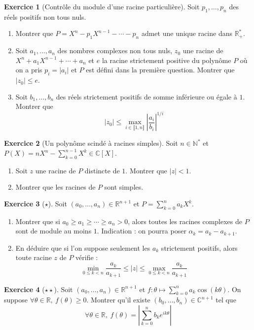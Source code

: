 \documentclass[french]{book}
\newcommand{\N}{\mathbb{N}}
\newcommand{\R}{\mathbb{R}}
\newcommand{\C}{\mathbb{C}}
\newcommand{\st}{^*}
\theoremstyle{definition}
\newtheorem{ex}{Exercice}[chapter]
\theoremstyle{theorem}
\theoremstyle{remark}
\begin{document}
\begin{ex}[Contrôle du module d'une racine particulière]
	Soit $p_1,\ldots,p_n$ des réels positifs non tous nuls.
	\begin{enumerate}
		\item Montrer que $P=X^n-p_1X^{n-1}-\cdots-p_n$ admet une unique racine dans $\R_+\st$.
		\item Soit $a_1,\ldots,a_n$ des nombres complexes non tous nuls, $z_0$ une racine de $X^n+a_1X^{n-1}+\cdots+a_n$ et $e$ la racine strictement positive du polynôme $P$ où on a pris $p_i=\lvert a_i\rvert$ et $P$ est défini dans la première question. Montrer que $\lvert z_0\rvert\leqslant e$.
		\item Soit $b_1,\ldots,b_n$ des réels strictement positifs de somme inférieure ou égale à $1$. Montrer que $$\lvert z_0\rvert\leqslant\max_{i\in\llbracket1,n\rrbracket}\left\lvert\frac{a_i}{b_i}\right\rvert^{1/i}$$
	\end{enumerate}
\end{ex}

\begin{ex}[Un polynôme scindé à racines simples]
	Soit $n\in\N\st$ et $P(X)=nX^n-\sum_{k=0}^{n-1}X^k\in\C[X]$.
	\begin{enumerate}
		\item Soit $z$ une racine de $P$ distincte de $1$. Montrer que $\lvert z\rvert <1$.
		\item Montrer que les racines de $P$ sont simples.
	\end{enumerate}
\end{ex}

\begin{ex}[$\star$]
	Soit $(a_0,\ldots,a_n)\in\R^{n+1}$ et $P=\displaystyle\sum_{k=0}^{n}a_kX^k$.
	\begin{enumerate}
		\item Montrer que si $a_0\geqslant a_1\geqslant\cdots\geqslant a_n>0$, alors toutes les racines complexes de $P$ sont de module au moins $1$. Indication : on pourra poser $\alpha_k=a_k-a_{k+1}$.
		\item En déduire que si l'on suppose seulement les $a_k$ strictement positifs, alors toute racine $z$ de $P$ vérifie : $$\min_{0\leqslant k<n}\frac{a_k}{a_{k+1}}\leqslant \lvert z\rvert\leqslant\max_{0\leqslant k<n}\frac{a_k}{a_{k+1}}$$
	\end{enumerate}
\end{ex}

\begin{ex}[$\star\star$]
	Soit $(a_0,\ldots,a_n)\in\R^{n+1}$ et $f:\theta\mapsto\displaystyle\sum_{k=0}^{n}a_k\cos(k\theta)$. On suppose $\forall\theta\in\R,\ f(\theta)\geqslant0$. Montrer qu'il existe $(b_0,\ldots,b_n)\in\C^{n+1}$ tel que $$\forall\theta\in\R,\ f(\theta)=\left\lvert\sum_{k=0}^{n}b_ke^{ik\theta}\right\rvert$$
\end{ex}
\end{document}
